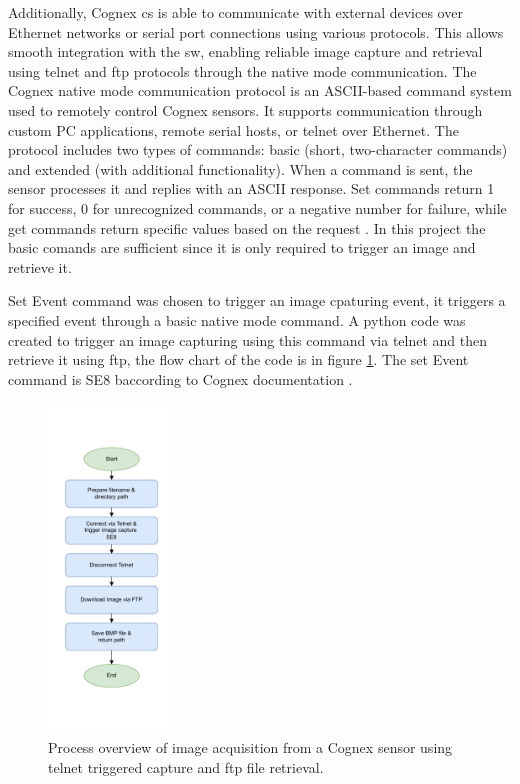 Additionally, Cognex \gls{cs} is able to communicate with external devices over Ethernet networks or serial port connections using various protocols. This allows smooth integration with the \gls{sw}, enabling reliable image capture and retrieval using \gls{telnet} and \gls{ftp} protocols through the native mode communication. The Cognex native mode communication protocol is an ASCII-based command system used to remotely control Cognex sensors. It supports communication through custom PC applications, remote serial hosts, or \gls{telnet} over Ethernet. The protocol includes two types of commands: basic (short, two-character commands) and extended (with additional functionality). When a command is sent, the sensor processes it and replies with an ASCII response. Set commands return 1 for success, 0 for unrecognized commands, or a negative number for failure, while get commands return specific values based on the request \cite{Cognex_Com}. In this project the basic comands are sufficient since it is only required to trigger an image and retrieve it. 

Set Event command was chosen to trigger an image cpaturing event, it triggers a specified event through a basic native mode command. A python code was created to trigger an image capturing using this command via \gls{telnet} and then retrieve it using \gls{ftp}, the flow chart of the code is in figure \ref{Image_capture_code}. The set Event command is SE8 baccording to Cognex documentation \cite{Cognex_Com}.

\begin{figure}[!htb]
    \centering
    \includegraphics[width=0.3\textwidth]{Figures/diagrams/Image_Capturing.pdf}
    \caption{Process overview of image acquisition from a Cognex sensor using \gls{telnet} triggered capture and \gls{ftp} file retrieval.}
    \label{Image_capture_code}
\end{figure}

